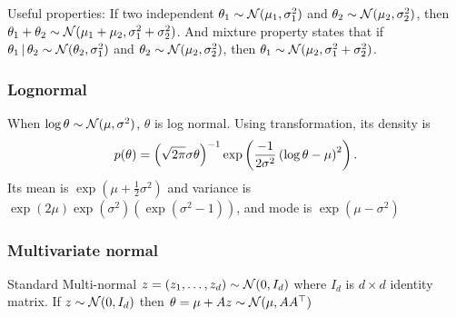 \documentclass[11pt,a4paper]{article}
\begin{document}
Useful properties: If two independent \(\theta_1\sim\mathcal{N}(\mu_1,\sigma_1^2)\) and \(\theta_2\sim\mathcal{N}(\mu_2,\sigma_2^2)\), then \(\theta_1+\theta_2\sim\mathcal{N}(\mu_1+\mu_2,\sigma_1^2+\sigma_2^2)\). And mixture property states that if \(\theta_1\,|\,\theta_2\sim\mathcal{N}(\theta_2,\sigma_1^2)\) and \(\theta_2\sim\mathcal{N}(\mu_2,\sigma_2^2)\), then \(\theta_1\sim\mathcal{N}(\mu_2,\sigma_1^2+\sigma_2^2)\).

\subsubsection*{Lognormal}

When \(\log\theta\sim\mathcal{N}(\mu,\sigma^2)\), \(\theta\) is log normal. Using transformation, its density is $$p(\theta)=\left( \sqrt{2\pi}\sigma\theta \right)^{-1}\exp\left( \frac{-1}{2\sigma^2}\left( \log\theta-\mu \right)^2 \right).$$ Its mean is \(\exp(\mu+\frac{1}{2}\sigma^2)\) and variance is \(\exp(2\mu)\exp(\sigma^2)(\exp(\sigma^2-1))\), and mode is \(\exp(\mu-\sigma^2)\)


\subsubsection*{Multivariate normal}

Standard Multi-normal \(z=(z_1,\dots,z_d)\sim\mathcal{N}(0,I_d)\) where \(I_d\) is \(d\times d\) identity matrix. If \(z\sim\mathcal{N}(0,I_d)\) then \(\theta=\mu+Az\sim\mathcal{N}(\mu,A{A}^\top)\)
\end{document}
